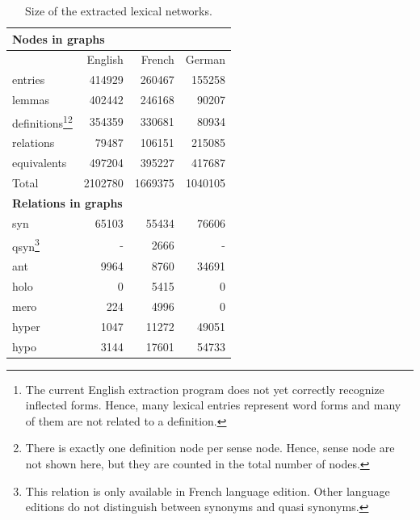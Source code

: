 \documentclass[10pt, a4paper]{article}
\begin{document}
\begin{table}[htb]
\begin{minipage}{\linewidth}
\begin{tabular}{lrrr}
\multicolumn{4}{l}{\textbf{Nodes in graphs}}\\
\hline
			& English & French & German \\
entries &  414929 &  260467  &  155258  \\
lemmas 	& 402442  & 246168 & 90207  \\
definitions\footnote{The current English extraction program does not yet correctly recognize inflected forms. Hence, many lexical entries represent word forms and many of them are not related to a definition.}\footnote{There is exactly one definition node per sense node. Hence, sense node are not shown here, but they are counted in the total number of nodes.}
			& 354359 & 330681 & 80934 \\
relations  & 79487 & 106151 & 215085 \\
equivalents & 497204 & 395227 & 417687 \\
Total		& 2102780 & 1669375 & 1040105\\
\multicolumn{4}{l}{\textbf{Relations in graphs}}\\
\hline
syn	& 65103& 55434& 76606\\
qsyn\footnote{This relation is only available in French language edition. Other language editions do not distinguish between synonyms and quasi synonyms.}
	& -& 2666 & -\\
ant	& 9964& 8760& 34691\\
holo	& 0  & 5415& 0 \\
mero	& 224& 4996&0 \\
hyper	& 1047& 11272& 49051\\
hypo	& 3144& 17601& 54733\\
\end{tabular}
\end{minipage}
\caption{Size of the extracted lexical networks.}
\label{table:size}
\end{table}
\end{document}
